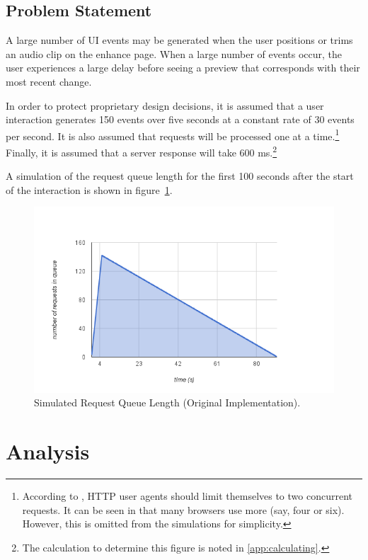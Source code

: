 \documentclass[se,resubmit]{uw-wkrpt}
\begin{document}
\subsection{Problem Statement}\label{sec:problem}
A large number of UI events may be generated when the user positions or
trims an audio clip on the enhance page. When a large number of events
occur, the user experiences a large delay before seeing a preview that
corresponds with their most recent change.

In order to protect proprietary design decisions, it is assumed that a
user interaction generates 150 events over five seconds at a constant rate
of 30 events per second. It is also assumed that requests will be
processed one at a time.\footnote{According to \cite{ref:http}, HTTP user
agents should limit themselves to two concurrent requests. It can be seen
in \cite{ref:b423377} that many browsers use more (say, four or six).
However, this is omitted from the simulations for simplicity.} Finally, it
is assumed that a server response will take 600 ms.\footnote{The
calculation to determine this figure is noted in \ref{app:calculating}.}

A simulation of the request queue length for the first 100 seconds after
the start of the interaction is shown in figure~\ref{fig:sim-orig}.

\begin{figure}
  \centering
  \includegraphics[width=6.25in]{sim-orig}
  \caption{Simulated Request Queue Length (Original Implementation).}
  \label{fig:sim-orig}
\end{figure}

\section{Analysis}
\end{document}
